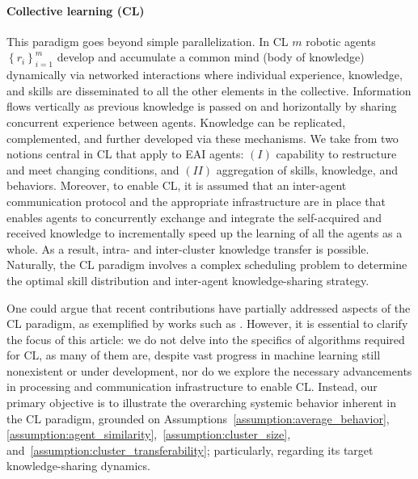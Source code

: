 \documentclass[12pt]{article}
\begin{document}
\paragraph*{\textbf{Collective learning (CL)}}
This paradigm  goes beyond simple parallelization. In CL $m$ robotic agents $ \left\lbrace r_i \right\rbrace_{i=1}^{m} $  develop and accumulate a common mind (body of knowledge) dynamically via networked interactions where individual experience, knowledge, and skills are disseminated to all the other elements in the collective. Information flows vertically as previous knowledge is passed on and horizontally by sharing concurrent experience between agents. Knowledge can be replicated, complemented, and further developed via these mechanisms. We take from \cite{Garavan2012CollectiveLearning} two notions central in CL that apply to EAI agents:
$(I)$ capability to restructure and meet changing conditions, and $(II)$ aggregation of skills, knowledge, and behaviors. Moreover, to enable CL, it is assumed that an inter-agent communication protocol and the appropriate infrastructure are in place that enables agents to concurrently exchange and integrate the self-acquired and received knowledge to incrementally speed up the learning of all the agents as a whole. As a result, intra- and inter-cluster knowledge transfer is possible. Naturally, the CL paradigm involves a complex scheduling problem to determine the optimal skill distribution and inter-agent knowledge-sharing strategy. 

One could argue that recent contributions have partially addressed aspects of the CL paradigm, as exemplified by works such as \cite{levine2018learning, rudin2022learning, flairop2023}. However, it is essential to clarify the focus of this article: we do not delve into the specifics of algorithms required for CL, as many of them are, despite vast progress in machine learning still nonexistent or under development, nor do we explore the necessary advancements in processing and communication infrastructure to enable CL. Instead, our primary objective is to illustrate the overarching systemic behavior inherent in the CL paradigm, grounded on Assumptions~\ref{assumption:average_behavior}, \ref{assumption:agent_similarity},~\ref{assumption:cluster_size}, and~\ref{assumption:cluster_transferability}; particularly,  regarding its target knowledge-sharing dynamics.
\end{document}
